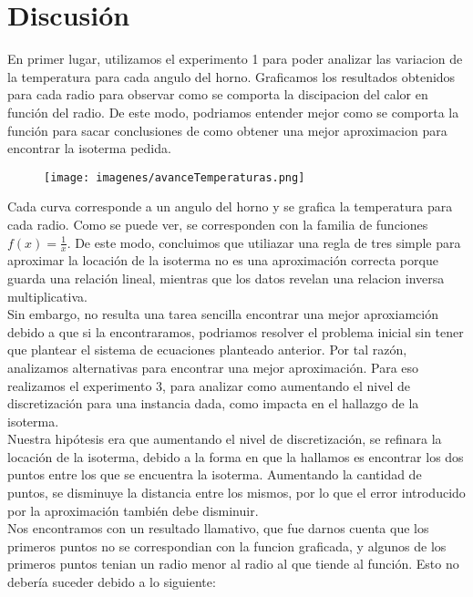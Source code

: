 \section{Discusión}
En primer lugar, utilizamos el experimento 1 para poder analizar las variacion de la temperatura para cada angulo del horno. Graficamos los resultados obtenidos para cada radio para observar como se comporta la discipacion del calor en función del radio. De este modo, podriamos entender mejor como se comporta la función para sacar conclusiones de como obtener una mejor aproximacion para encontrar la isoterma pedida.

\begin{figure}[h]
  \center
  \texttt{[image: imagenes/avanceTemperaturas.png]}
  \label{fig:avanceTemps}
\end{figure}

Cada curva corresponde a un angulo del horno y se grafica la temperatura para cada radio. Como se puede ver, se corresponden con la familia de funciones $f(x)= \frac{1}{x}$. De este modo, concluimos que utiliazar una regla de tres simple para aproximar la locación de la isoterma no es una aproximación correcta porque guarda una relación lineal, mientras que los datos revelan una relacion inversa multiplicativa. \\
Sin embargo, no resulta una tarea sencilla encontrar una mejor aproxiamción debido a que si la encontraramos, podriamos resolver el problema inicial sin tener que plantear el sistema de ecuaciones planteado anterior. Por tal razón, analizamos alternativas para encontrar una mejor aproximación. Para eso realizamos el experimento 3, para analizar como aumentando el nivel de discretización para una instancia dada, como impacta en el hallazgo de la isoterma. \\
Nuestra hipótesis era que aumentando el nivel de discretización, se refinara la locación de la isoterma, debido a la forma en que la hallamos es encontrar los dos puntos entre los que se encuentra la isoterma. Aumentando la cantidad de puntos, se disminuye la distancia entre los mismos, por lo que el error introducido por la aproximación también debe disminuir. \\
Nos encontramos con un resultado llamativo, que fue darnos cuenta que los primeros puntos no se correspondian con la funcion graficada, y algunos de los primeros puntos tenian un radio menor al radio al que tiende al función. Esto no debería suceder debido a lo siguiente: 
\newpage

